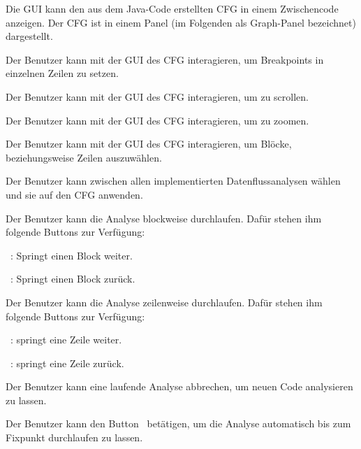 Die GUI kann den aus dem Java-Code erstellten CFG in einem Zwischencode anzeigen. Der CFG ist in einem Panel (im Folgenden als Graph-Panel bezeichnet) dargestellt.

Der Benutzer kann mit der GUI des CFG interagieren, um Breakpoints in einzelnen Zeilen zu setzen.

Der Benutzer kann mit der GUI des CFG interagieren, um zu scrollen.

Der Benutzer kann mit der GUI des CFG interagieren, um zu zoomen.

Der Benutzer kann mit der GUI des CFG interagieren, um Blöcke, beziehungsweise Zeilen auszuwählen.

Der Benutzer kann zwischen allen implementierten Datenflussanalysen wählen und sie auf den CFG anwenden.

Der Benutzer kann die Analyse blockweise durchlaufen. Dafür stehen ihm folgende Buttons zur Verfügung:\par
\faFastForward\ : Springt einen Block weiter.\par
\faFastBackward\ : Springt einen Block zurück.

Der Benutzer kann die Analyse zeilenweise durchlaufen. Dafür stehen ihm folgende Buttons zur Verfügung:\par
\faStepForward\ : springt eine Zeile weiter.\par
\faStepBackward\ : springt eine Zeile zurück.

Der Benutzer kann eine laufende Analyse abbrechen, um neuen Code analysieren zu lassen.

Der Benutzer kann den Button  \faPlay\  betätigen, um die Analyse automatisch bis zum Fixpunkt durchlaufen zu lassen.

